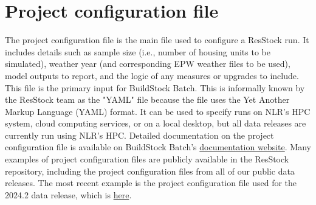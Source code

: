 \section{Project configuration file} \label{sec:project_config_file}
The project configuration file is the main file used to configure a ResStock run. It includes details such as sample size (i.e., number of housing units to be simulated), weather year (and corresponding EPW weather files to be used), model outputs to report, and the logic of any measures or upgrades to include. This file is the primary input for BuildStock Batch. This is informally known by the ResStock team as the "YAML" file because the file uses the Yet Another Markup Language (YAML) format. It can be used to specify runs on NLR's HPC system, cloud computing services, or on a local desktop, but all data releases are currently run using NLR's HPC.  Detailed documentation on the project configuration file is available on BuildStock Batch's  \href{https://buildstockbatch.readthedocs.io/en/v2023.10.0/project_defn.html}{documentation website}. Many examples of project configuration files are publicly available in the ResStock repository, including the project configuration files from all of our public data releases. The most recent example is the project configuration file used for the 2024.2 data release, which is \href{https://github.com/NREL/resstock/blob/v3.2.0-2024.2/project_national/EUSSRR2_project_500k_AMY2018.yml}{here}.

